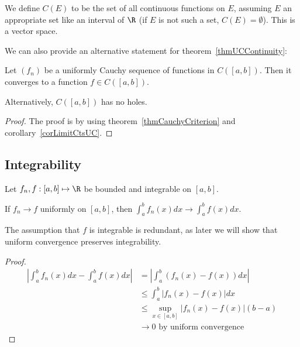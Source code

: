 \documentclass[../Main.tex]{subfiles}
\begin{document}
\begin{remark}
    We define $C(E)$ to be the set of all continuous functions on $E$, assuming $E$ an appropriate set like an interval of $\R$ (if $E$ is not such a set, $C(E) = \emptyset$). This is a vector space.
\end{remark}
We can also provide an alternative statement for theorem~\ref{thmUCContinuity}:
\begin{corollary}
    Let $(f_n)$ be a uniformly Cauchy sequence of functions in $C([a, b])$. Then it converges to a function $f \in C([a, b])$.
    \label{corUCauchyCts}
\end{corollary}
Alternatively, $C([a, b])$ has no holes.
\begin{proof}
    The proof is by using theorem~\ref{thmCauchyCriterion} and corollary~\ref{corLimitCtsUC}.
\end{proof}
\subsection{Integrability} %
\begin{theorem}
    Let $f_n, f : [a, b] \mapsto \R$ be bounded and integrable on $[a, b]$.

    If $f_n \to f$ uniformly on $[a, b]$, then $\int_{a}^{b} f_n(x) dx \to \int_{a}^{b} f(x) dx$.
    \label{thmUCIntegrals}
\end{theorem}
\begin{remark}
    The assumption that $f$ is integrable is redundant, as later we will show that uniform convergence preserves integrability.
\end{remark}
\begin{proof}
    \begin{align*}
        \left|\int_{a}^{b} f_n(x) dx - \int_{a}^{b} f(x) dx\right| &= \left|\int_{a}^{b} (f_n(x) - f(x)) dx\right| \\
        &\leq \int_{a}^{b} |f_n(x) - f(x)| dx \\
        &\leq \sup_{x \in [a, b]} |f_n(x) - f(x)|(b - a) \\
        &\to 0 \text{ by uniform convergence}
    \end{align*}
\end{proof}
\end{document}

